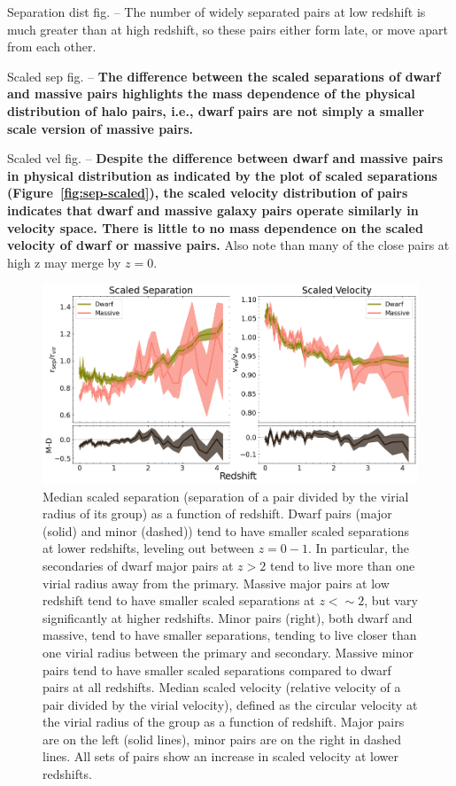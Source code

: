 \documentclass[twocolumn]{aastex631}
\begin{document}
Separation dist fig. -- The number of widely separated pairs at low redshift is much greater than at high redshift, so these pairs either form late, or move apart from each other. 

Scaled sep fig. -- \textbf{The difference between the scaled separations of dwarf and massive pairs highlights the mass dependence of the physical distribution of halo pairs, i.e., dwarf pairs are not simply a smaller scale version of massive pairs.}

Scaled vel fig. --   \textbf{Despite the difference between dwarf and massive pairs in physical distribution as indicated by the plot of scaled separations (Figure~\ref{fig:sep-scaled}), the scaled velocity distribution of pairs indicates that dwarf and massive galaxy pairs operate similarly in velocity space. There is little to no mass dependence on the scaled velocity of dwarf or massive pairs.}
Also note than many of the close pairs at high z may merge by $z=0$.

\begin{figure}[htp]
  \centering
  \includegraphics[width=\textwidth]{scaledcombo_1000.png}
  \caption{Median scaled separation (separation of a pair divided by the virial radius of its group) as a function of redshift. Dwarf pairs (major (solid) and minor (dashed)) tend to have smaller scaled separations at lower redshifts, leveling out between $z=0-1$. In particular, the secondaries of dwarf major pairs at $z>2$ tend to live more than one virial radius away from the primary. Massive major pairs at low redshift tend to have smaller scaled separations  at $z<\sim2$, but vary significantly at higher redshifts. 
  Minor pairs (right), both dwarf and massive, tend to have smaller separations, tending to live closer than one virial radius between the primary and secondary. Massive minor pairs tend to have smaller scaled separations compared to dwarf pairs at all redshifts.
   
  Median scaled velocity (relative velocity of a pair divided by the virial velocity), defined as the circular velocity at the virial radius of the group as a function of redshift. 
  Major pairs are on the left (solid lines), minor pairs are on the right in dashed lines.
  All sets of pairs show an increase in scaled velocity at lower redshifts.
   
    }
  \label{fig:scaled}
\end{figure}
\end{document}
